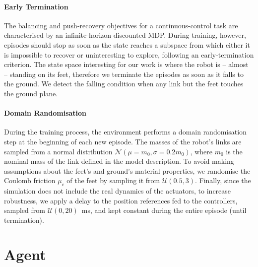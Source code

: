 \paragraph{Early Termination}

The balancing and push-recovery objectives for a continuous-control task are characterised by an infinite-horizon discounted \ac{MDP}.
During training, however, episodes should stop as soon as the state reaches a subspace from which either it is impossible to recover or uninteresting to explore, following an early-termination criterion.
The state space interesting for our work is where the robot is -- almost -- standing on its feet, therefore we terminate the episodes as soon as it falls to the ground.
We detect the falling condition when any link but the feet touches the ground plane.

\paragraph{Domain Randomisation}

During the training process, the environment performs a domain randomisation step at the beginning of each new episode.
The masses of the robot's links are sampled from a normal distribution $\mathcal{N}(\mu=m_0, \sigma=0.2 m_0)$, where $m_0$ is the nominal mass of the link defined in the model description.
To avoid making assumptions about the feet's and ground's material properties, we randomise the Coulomb friction $\mu_c$ of the feet by sampling it from $\mathcal{U}(0.5, 3)$.
Finally, since the simulation does not include the real dynamics of the actuators, to increase robustness, we apply a delay to the position references fed to the \pid controllers, sampled from $\mathcal{U}(0, 20)$~ms, and kept constant during the entire episode (until termination).

\section{Agent}

